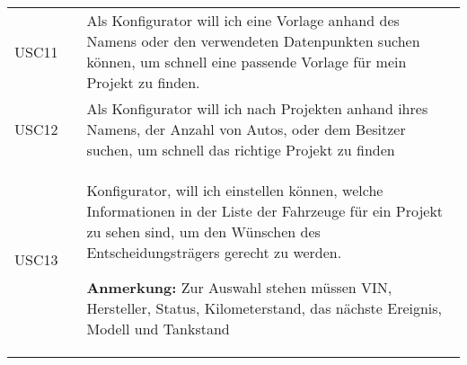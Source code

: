 \begin{footnotesize}
\begin{longtable}[i i L]{ p{} p{} p{} }
      USC11 & & Als Konfigurator will ich eine Vorlage anhand des Namens oder den verwendeten Datenpunkten suchen können, um schnell eine passende Vorlage für mein Projekt zu finden. \\
      USC12 & & Als Konfigurator will ich nach Projekten anhand ihres Namens, der Anzahl von Autos, oder dem Besitzer suchen, um schnell das richtige Projekt zu finden \\
      USC13 & & Konfigurator, will ich einstellen können, welche Informationen in der Liste der Fahrzeuge für ein Projekt zu sehen sind, um den Wünschen des Entscheidungsträgers gerecht zu werden.

      \textbf{Anmerkung:} Zur Auswahl stehen müssen VIN, Hersteller, Status, Kilometerstand, das nächste Ereignis, Modell und Tankstand
      \\

      \bottomrule
    \end{longtable}
  \end{footnotesize}
  \rmfamily
